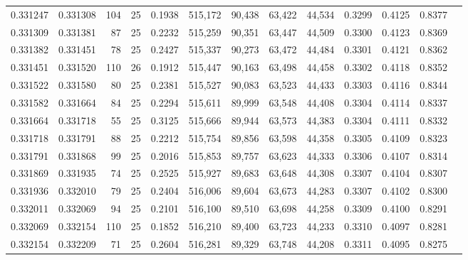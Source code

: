 \begin{tabular}{rrrrrrrrrrrrr}
0.331247 & 0.331308 &   104 &  25 &                                     0.1938 & 515,172 &  90,438 &  63,422 &  44,534 & 0.3299 & 0.4125 & 0.8377 \\
0.331309 & 0.331381 &    87 &  25 &                                     0.2232 & 515,259 &  90,351 &  63,447 &  44,509 & 0.3300 & 0.4123 & 0.8369 \\
0.331382 & 0.331451 &    78 &  25 &                                     0.2427 & 515,337 &  90,273 &  63,472 &  44,484 & 0.3301 & 0.4121 & 0.8362 \\
0.331451 & 0.331520 &   110 &  26 &                                     0.1912 & 515,447 &  90,163 &  63,498 &  44,458 & 0.3302 & 0.4118 & 0.8352 \\
0.331522 & 0.331580 &    80 &  25 &                                     0.2381 & 515,527 &  90,083 &  63,523 &  44,433 & 0.3303 & 0.4116 & 0.8344 \\
0.331582 & 0.331664 &    84 &  25 &                                     0.2294 & 515,611 &  89,999 &  63,548 &  44,408 & 0.3304 & 0.4114 & 0.8337 \\
0.331664 & 0.331718 &    55 &  25 &                                     0.3125 & 515,666 &  89,944 &  63,573 &  44,383 & 0.3304 & 0.4111 & 0.8332 \\
0.331718 & 0.331791 &    88 &  25 &                                     0.2212 & 515,754 &  89,856 &  63,598 &  44,358 & 0.3305 & 0.4109 & 0.8323 \\
0.331791 & 0.331868 &    99 &  25 &                                     0.2016 & 515,853 &  89,757 &  63,623 &  44,333 & 0.3306 & 0.4107 & 0.8314 \\
0.331869 & 0.331935 &    74 &  25 &                                     0.2525 & 515,927 &  89,683 &  63,648 &  44,308 & 0.3307 & 0.4104 & 0.8307 \\
0.331936 & 0.332010 &    79 &  25 &                                     0.2404 & 516,006 &  89,604 &  63,673 &  44,283 & 0.3307 & 0.4102 & 0.8300 \\
0.332011 & 0.332069 &    94 &  25 &                                     0.2101 & 516,100 &  89,510 &  63,698 &  44,258 & 0.3309 & 0.4100 & 0.8291 \\
0.332069 & 0.332154 &   110 &  25 &                                     0.1852 & 516,210 &  89,400 &  63,723 &  44,233 & 0.3310 & 0.4097 & 0.8281 \\
0.332154 & 0.332209 &    71 &  25 &                                     0.2604 & 516,281 &  89,329 &  63,748 &  44,208 & 0.3311 & 0.4095 & 0.8275 \\

\end{tabular}
